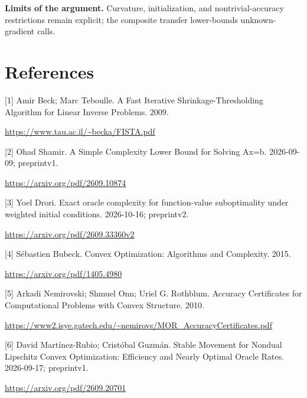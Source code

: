 \documentclass[10pt,a4paper]{article}
\begin{document}
\textbf{Limits of the argument.} Curvature, initialization, and nontrivial-accuracy restrictions remain explicit; the composite transfer lower-bounds unknown-gradient calls.

\section{References}
[1] Amir Beck; Marc Teboulle. A Fast Iterative Shrinkage-Thresholding Algorithm for Linear Inverse Problems. 2009.

\url{https://www.tau.ac.il/~becka/FISTA.pdf}

[2] Ohad Shamir. A Simple Complexity Lower Bound for Solving Ax=b. 2026-09-09; preprintv1.

\url{https://arxiv.org/pdf/2609.10874}

[3] Yoel Drori. Exact oracle complexity for function-value suboptimality under weighted initial conditions. 2026-10-16; preprintv2.

\url{https://arxiv.org/pdf/2609.33360v2}

[4] Sébastien Bubeck. Convex Optimization: Algorithms and Complexity. 2015.

\url{https://arxiv.org/pdf/1405.4980}

[5] Arkadi Nemirovski; Shmuel Onn; Uriel G. Rothblum. Accuracy Certificates for Computational Problems with Convex Structure. 2010.

\url{https://www2.isye.gatech.edu/~nemirovs/MOR_AccuracyCertificates.pdf}

[6] David Martínez-Rubio; Cristóbal Guzmán. Stable Movement for Nondual Lipschitz Convex Optimization: Efficiency and Nearly Optimal Oracle Rates. 2026-09-17; preprintv1.

\url{https://arxiv.org/pdf/2609.20701}
\end{document}

